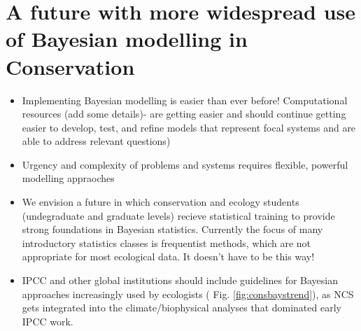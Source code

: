 \documentclass{article}
\begin{document}
\section* {A future with more widespread use of Bayesian modelling in Conservation}
\begin{itemize}
\item Implementing Bayesian modelling is easier than ever before! Computational resources (add some details)- are getting easier and should continue getting easier to develop, test, and refine models that represent focal systems and are able to address relevant questions)
\item Urgency and complexity of problems and systems requires flexible, powerful modelling appraoches 
\item We envision a future in which conservation and ecology students (undegraduate and graduate levels) recieve statistical training to provide strong foundations in Bayesian statistics. Currently the focus of many introductory statistics classes is frequentist methods, which are not appropriate for most ecological data. It doesn't have to be this way! 
\item IPCC and other global institutions should include guidelines for Bayesian approaches increasingly used by ecologists ( Fig. \ref{fig:consbaystrend}), as NCS gets integrated into the climate/biophysical analyses that dominated early IPCC work.
\end{itemize}

\par 
\end{document}
